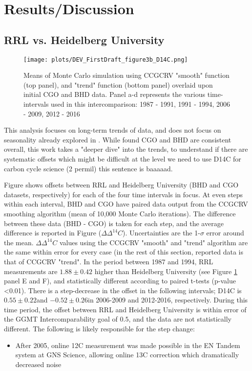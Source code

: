 \documentclass{article}
\begin{document}
\newpage
\section{Results/Discussion}

\subsection{RRL vs. Heidelberg University}

\begin{figure}[h!]
  \texttt{[image: plots/DEV\_FirstDraft\_figure3b\_D14C.png]}
  \caption{Means of Monte Carlo simulation using CCGCRV "smooth" function (top panel), and "trend" function (bottom panel) overlaid upon initial CGO and BHD data. Panel a-d represents the various time-intervals used in this intercomparison: 1987 - 1991, 1991 - 1994, 2006 - 2009, 2012 - 2016}
  \label{fig:results1}
\end{figure}
This analysis focuses on long-term trends of data, and does not focus on seasonality already explored in \cite{turnbull2017}. While \cite{turnbull2017} found CGO and BHD are consistent overall, this work takes a "deeper dive" into the trends, to understand if there are systematic offsets which might be difficult at the level we need to use D14C for carbon cycle science (2 permil) this sentence is baaaaad.

Figure shows offsets between RRL and Heidelberg University (BHD and CGO datasets, respectively) for each of the four time intervals in focus. At even steps within each interval, BHD and CGO have paired data output from the CCGCRV smoothing algorithm (mean of 10,000 Monte Carlo iterations). The difference between these data (BHD - CGO) is taken for each step, and the average difference is reported in Figure  (${\Delta\Delta^{14}C}$). Uncertainties are the 1-$\sigma$ error around the mean.
${\Delta\Delta^{14}C}$ values using the CCGCRV "smooth" and "trend" algorithm are the same within error for every case (in the rest of this section, reported data is that of CCGCRV "trend". In the period between 1987 and 1994, RRL measurements are $1.88\pm0.42$ higher than Heidelberg University (see Figure \ref{fig:results1} panel E and F), and statistically different according to paired t-tests (p-value <0.01). 
There is a step-decrease in the offset in the following intervals; D14C is  $0.55\pm0.22$\textperthousand and $-0.52\pm0.26$\textperthousand in 2006-2009 and 2012-2016, respectively. During this time period, the offset between RRL and Heidelberg University is within error of the GGMT Intercomparability goal of $0.5$\textperthousand, and the data are not statistically different. 
The following is likely responsible for the step change: 
\begin{itemize}

	\item After 2005, online 12C measurement was made possible in the EN Tandem system at GNS Science, allowing online 13C correction which dramatically decreased noise \cite{turnbull2017}
\end{itemize}
\end{document}
